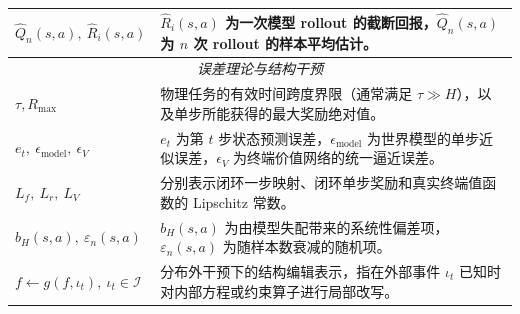\documentclass[UTF8]{ctexart}
\begin{document}
\begin{table}[ht]
\begin{tabular}{p{} p{}}
$\hat{Q}_n(s,a),\ \hat R_i(s,a)$ & \(\hat R_i(s,a)\) 为一次模型 rollout 的截断回报，\(\hat Q_n(s,a)\) 为 \(n\) 次 rollout 的样本平均估计。 \\
\midrule
\multicolumn{2}{c}{\textit{误差理论与结构干预}} \\
\midrule
$\tau, R_{\max}$ & 物理任务的有效时间跨度界限（通常满足 $\tau \gg H$），以及单步所能获得的最大奖励绝对值。 \\
$e_t,\ \epsilon_{\text{model}},\ \epsilon_V$ & \(e_t\) 为第 \(t\) 步状态预测误差，\(\epsilon_{\text{model}}\) 为世界模型的单步近似误差，\(\epsilon_V\) 为终端价值网络的统一逼近误差。 \\
$L_f,\ L_r,\ L_V$ & 分别表示闭环一步映射、闭环单步奖励和真实终端值函数的 Lipschitz 常数。 \\
$b_H(s,a),\ \varepsilon_n(s,a)$ & \(b_H(s,a)\) 为由模型失配带来的系统性偏差项，\(\varepsilon_n(s,a)\) 为随样本数衰减的随机项。 \\
$f \leftarrow g(f,\iota_t),\ \iota_t \in \mathcal{I}$ & 分布外干预下的结构编辑表示，指在外部事件 \(\iota_t\) 已知时对内部方程或约束算子进行局部改写。 \\
\bottomrule
\end{tabular}
\end{table}
\end{document}
